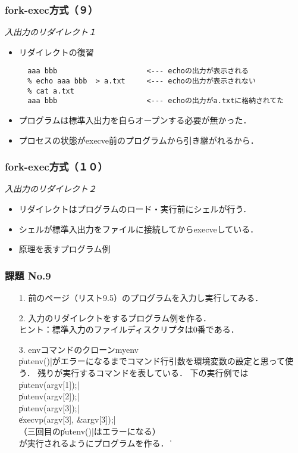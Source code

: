 \documentclass{beamer}                 %
\begin{document}
\begin{frame}[fragile]
  \frametitle{fork-exec方式（９）}
  \emph{入出力のリダイレクト１} \\
  \begin{itemize}
  \item リダイレクトの復習
\begin{lstlisting}[numbers=none]
  % echo aaa bbb
  aaa bbb                     <--- echoの出力が表示される
  % echo aaa bbb  > a.txt     <--- echoの出力が表示されない
  % cat a.txt
  aaa bbb                     <--- echoの出力がa.txtに格納されてた
\end{lstlisting} %
  \item プログラムは標準入出力を自らオープンする必要が無かった．
  \item プロセスの状態がexecve前のプログラムから引き継がれるから．
  \end{itemize}
  \vfill
\end{frame}

\begin{frame}[fragile]
  \frametitle{fork-exec方式（１０）}
  \emph{入出力のリダイレクト２} \\
  \begin{itemize}
  \item リダイレクトはプログラムのロード・実行前にシェルが行う．
  \item シェルが標準入出力をファイルに接続してからexecveしている．
  \item 原理を表すプログラム例
  \end{itemize}
  \vfill
\end{frame}

\begin{frame}[fragile]
  \frametitle{課題 No.9}
  \begin{enumerate}
  \item[1.] 前のページ（リスト9.5）のプログラムを入力し実行してみる．
  \item[2.] 入力のリダイレクトをするプログラム例を作る． \\
    ヒント：標準入力のファイルディスクリプタは0番である．
  \item[3.] envコマンドのクローンmyenv \\
    \|putenv()|がエラーになるまでコマンド行引数を環境変数の設定と思って使う．
    残りが実行するコマンドを表している．
    下の実行例では\\
    \|putenv(argv[1]);|\\
    \|putenv(argv[2]);|\\
    \|putenv(argv[3]);|\\
    \|execvp(argv[3], &argv[3]);|\\
    （三回目の\|putenv()|はエラーになる）\\
    が実行されるようにプログラムを作る．
    \vfill
    \|%
  \end{enumerate}
   \vfill
\end{frame}
\end{document}
